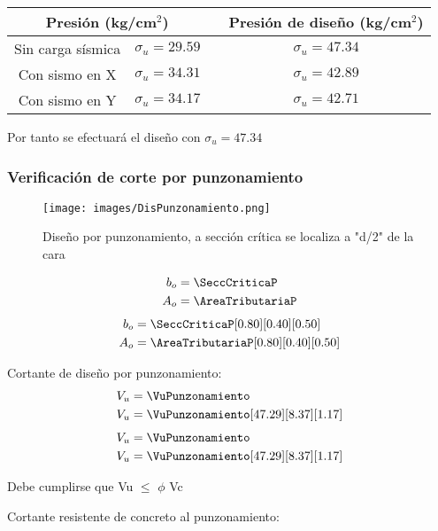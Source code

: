 \begin{table}[h!]
    \centering
    \begin{tabular}{ccc|c} \toprule
         \multicolumn{2}{c}{\textbf{Presión (kg/cm$^2$)}}   && \textbf{Presión de diseño (kg/cm$^2$)} \\ \midrule
        Sin carga sísmica   &   $\sigma_u =29.59 $  &&   $\sigma_u = 47.34$ \\ 
        Con sismo en X      &   $\sigma_u =34.31 $  &&   $\sigma_u = 42.89$ \\
        Con sismo en Y      &   $\sigma_u =34.17 $  &&   $\sigma_u = 42.71$ \\\bottomrule
    \end{tabular}
\end{table}

Por tanto se efectuará el diseño con $\sigma_u = 47.34$


\subsubsection{Verificación de corte por punzonamiento}
\begin{figure}[h!]
    \centering
    \texttt{[image: images/DisPunzonamiento.png]}
    \caption{Diseño por punzonamiento, a sección crítica se localiza a "d/2" de la cara}
    \label{fig:my_label}
\end{figure}
\begin{align}
	b_o &= \SeccCriticaP \\
	A_o &= \AreaTributariaP
\end{align}
\begin{align*}
	b_o &= \SeccCriticaP[0.80][0.40][0.50] \\
	A_o &= \AreaTributariaP[0.80][0.40][0.50]
\end{align*}

Cortante de diseño por punzonamiento:
\begin{align}
	V_u &= \VuPunzonamiento \\
	V_u &= \VuPunzonamiento[47.29][8.37][1.17]
\end{align}
\begin{align}
	V_u &= \VuPunzonamiento \\
	V_u &= \VuPunzonamiento[47.29][8.37][1.17]
\end{align}

Debe cumplirse que Vu $\leq$ $\phi$ Vc

Cortante resistente de concreto al punzonamiento:


